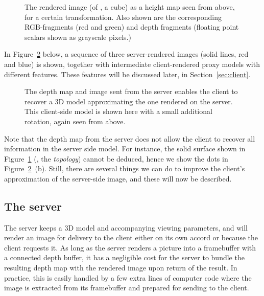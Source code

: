 \begin{figure}[htb]
  \centering
  

  \caption{\label{fig:2Dheightmap} The rendered image (of \eg, a cube) as a
           height map seen from above, for a certain transformation. Also shown
           are the corresponding RGB-fragments (red and green) and depth
           fragments (floating point scalars shown as grayscale pixels.)}
\end{figure}

In Figure~\ref{fig:2DheightmapRotated} below, a sequence of three server-rendered
images (solid lines, red and blue) is shown, together with intermediate
client-rendered proxy models with different features. These features will be
discussed later, in Section~\ref{sec:client}.

\begin{figure}[htb]
  \centering
  \caption{\label{fig:2DheightmapRotated}
           The depth map and image sent from the server enables the client to
           recover a 3D model approximating the one rendered on the server. This
           client-side model is shown here with a small additional rotation, again
           seen from above.}
\end{figure}

Note that the depth map from the server does not allow the client to recover all
information in the server side model. For instance, the solid surface shown in
Figure~\ref{fig:2Dheightmap} (\ie, the {\em topology}) cannot be deduced, hence
we show the dots in Figure~\ref{fig:2DheightmapRotated}~(b). Still, there are
several things we can do to improve the client's approximation of
the server-side image, and these will now be described.


\subsection{The server}

The server keeps a 3D model and accompanying viewing parameters, and will render
an image for delivery to the client either on its own accord or because the
client requests it. As long as the server renders a picture into a framebuffer
with a connected depth buffer, it has a negligible cost for the server to bundle
the resulting depth map with the rendered image upon return of the result. In
practice, this is easily handled by a few extra lines of computer code where the
image is extracted from its framebuffer and prepared for sending to the
client.

